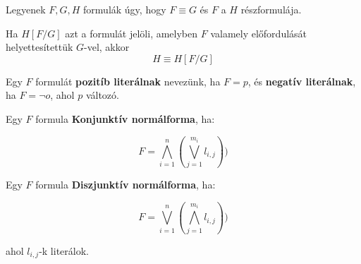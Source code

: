 \documentclass[10pt]{article}
\renewcommand{\\}{\par\noindent}
\begin{document}
\begin{frame}

\begin{tcolorbox}[title={Lemma: Helyettesítési Lemma}]
Legyenek $F, G, H$ formulák úgy, hogy $F \equiv G$ és $F$ a $H$ részformulája.\\
Ha $H[F/G]$ azt a formulát jelöli, amelyben $F$ valamely előfordulását helyettesítettük $G$-vel, akkor
$$H \equiv H[F/G]$$
\end{tcolorbox}

\end{frame}

\begin{frame}

\begin{tcolorbox}[title={Def.: Literál}]
Egy $F$ formulát \textbf{pozitíb literálnak} nevezünk, ha $F = p$, és \textbf{negatív literálnak}, ha $F = {\neg}o$, ahol $p$ változó.
\end{tcolorbox}

\begin{tcolorbox}[title={Def.: Konjunktív, diszjunktív normálforma}]
Egy $F$ formula \textbf{Konjunktív normálforma}, ha:\\
$$F = \bigwedge_{i = 1}^n (\bigvee_{j = 1}^{m_i} l_{i, j}))$$\\
Egy $F$ formula \textbf{Diszjunktív normálforma}, ha:\\
$$F = \bigvee_{i = 1}^n (\bigwedge_{j = 1}^{m_i} l_{i, j}))$$\\
ahol $l_{i, j}$-k literálok.
\end{tcolorbox}

\end{frame}
\end{document}
